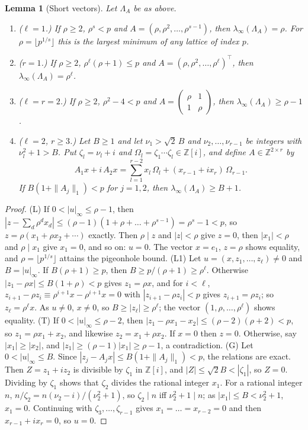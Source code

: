 \documentclass[11pt]{amsart}
\newtheorem{lemma}[theorem]{Lemma}
\theoremstyle{definition}
\theoremstyle{plain}
\newcommand{\Z}{\mathbb{Z}}
\begin{document}
\begin{lemma}[Short vectors]\label{lem:skellat}\label{lem:L12}
Let $\Lambda_A$ be as above.
\begin{enumerate}
\item[(L)] ($\ell=1$.) If $\rho\ge2$, $\rho^s<p$ and $A=(\rho,\rho^2,\dots,\rho^{s-1})$, then $\lambda_\infty(\Lambda_A)=\rho$. For $\rho=\lfloor p^{1/s}\rfloor$ this is the largest minimum of any lattice of index $p$.
\item[(L1)] ($r=1$.) If $\rho\ge2$, $\rho^\ell(\rho+1)\le p$ and $A=(\rho,\rho^2,\dots,\rho^\ell)^{\!\top}$, then $\lambda_\infty(\Lambda_A)=\rho^\ell$.
\item[(T)] ($\ell=r=2$.) If $\rho\ge2$, $\rho^2-4<p$ and $A=\left(\begin{smallmatrix}\rho&1\\1&\rho\end{smallmatrix}\right)$, then $\lambda_\infty(\Lambda_A)\ge\rho-1$.
\item[(G)] ($\ell=2$, $r\ge3$.) Let $B\ge1$ and let $\nu_1>\sqrt2\,B$ and $\nu_2,\dots,\nu_{r-1}$ be integers with $\nu_l^2+1>B$. Put $\zeta_l=\nu_l+i$ and $\Omega_l=\zeta_1\cdots\zeta_l\in\Z[i]$, and define $A\in\Z^{2\times r}$ by
\[
A_1x+i\,A_2x=\sum_{l=1}^{r-2}x_l\,\Omega_l+(x_{r-1}+ix_r)\,\Omega_{r-1}.
\]
If $B(1+\|A_j\|_1)<p$ for $j=1,2$, then $\lambda_\infty(\Lambda_A)\ge B+1$.
\end{enumerate}
\end{lemma}

\begin{proof}
(L) If $0<|u|_\infty\le\rho-1$, then $|z-\sum_d\rho^dx_d|\le(\rho-1)(1+\rho+\dots+\rho^{s-1})=\rho^s-1<p$, so $z=\rho(x_1+\rho x_2+\cdots)$ exactly. Then $\rho\mid z$ and $|z|<\rho$ give $z=0$, then $|x_1|<\rho$ and $\rho\mid x_1$ give $x_1=0$, and so on: $u=0$. The vector $x=e_1$, $z=\rho$ shows equality, and $\rho=\lfloor p^{1/s}\rfloor$ attains the pigeonhole bound. (L1) Let $u=(x,z_1,\dots,z_\ell)\ne0$ and $B=|u|_\infty$. If $B(\rho+1)\ge p$, then $B\ge p/(\rho+1)\ge\rho^\ell$. Otherwise $|z_1-\rho x|\le B(1+\rho)<p$ gives $z_1=\rho x$, and for $i<\ell$, $z_{i+1}-\rho z_i\equiv\rho^{i+1}x-\rho^{i+1}x=0$ with $|z_{i+1}-\rho z_i|<p$ gives $z_{i+1}=\rho z_i$; so $z_\ell=\rho^\ell x$. As $u\ne0$, $x\ne0$, so $B\ge|z_\ell|\ge\rho^\ell$; the vector $(1,\rho,\dots,\rho^\ell)$ shows equality. (T) If $0<|u|_\infty\le\rho-2$, then $|z_1-\rho x_1-x_2|\le(\rho-2)(\rho+2)<p$, so $z_1=\rho x_1+x_2$, and likewise $z_2=x_1+\rho x_2$. If $x=0$ then $z=0$. Otherwise, say $|x_1|\ge|x_2|$, and $|z_1|\ge(\rho-1)|x_1|\ge\rho-1$, a contradiction. (G) Let $0<|u|_\infty\le B$. Since $|z_j-A_jx|\le B(1+\|A_j\|_1)<p$, the relations are exact. Then $Z=z_1+iz_2$ is divisible by $\zeta_1$ in $\Z[i]$, and $|Z|\le\sqrt2B<|\zeta_1|$, so $Z=0$. Dividing by $\zeta_1$ shows that $\zeta_2$ divides the rational integer $x_1$. For a rational integer $n$, $n/\zeta_2=n(\nu_2-i)/(\nu_2^2+1)$, so $\zeta_2\mid n$ iff $\nu_2^2+1\mid n$; as $|x_1|\le B<\nu_2^2+1$, $x_1=0$. Continuing with $\zeta_3,\dots,\zeta_{r-1}$ gives $x_1=\dots=x_{r-2}=0$ and then $x_{r-1}+ix_r=0$, so $u=0$.
\end{proof}
\end{document}
